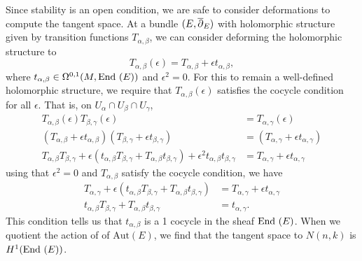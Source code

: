 	
	Since stability is an open condition, we are safe to consider deformations to compute the tangent space. At a bundle $(E,\overline{\partial}_E)$ with holomorphic structure given by transition functions $T_{\alpha,\beta}$, we can consider deforming the holomorphic structure to 
	\begin{equation}
	T_{\alpha,\beta}(\epsilon) = T_{\alpha,\beta} + \epsilon t_{\alpha,\beta},
	\end{equation}
	where $t_{\alpha,\beta} \in \Omega^{0,1}(M,\text{End }(E))$ and $\epsilon^2=0$. For this to remain a well-defined holomorphic structure, we require that $T_{\alpha,\beta}(\epsilon)$ satisfies the cocycle condition for all $\epsilon$. That is, on $U_{\alpha}\cap U_{\beta}\cap U_{\gamma}$,
	\begin{align*}
	T_{\alpha,\beta}(\epsilon)T_{\beta,\gamma}(\epsilon) &= T_{\alpha,\gamma}(\epsilon)\\
	\left(T_{\alpha,\beta} + \epsilon t_{\alpha,\beta} \right)
	\left(T_{\beta,\gamma} + \epsilon t_{\beta,\gamma} \right) &=
	\left(T_{\alpha,\gamma} + \epsilon t_{\alpha,\gamma} \right)\\
	T_{\alpha,\beta}T_{\beta,\gamma} + \epsilon(t_{\alpha,\beta}T_{\beta,\gamma} + T_{\alpha,\beta} t_{\beta,\gamma}) + \epsilon^2 t_{\alpha,\beta}t_{\beta,\gamma} &= T_{\alpha,\gamma} + \epsilon t_{\alpha,\gamma}
	\end{align*}
	using that $\epsilon^2 = 0$ and $T_{\alpha,\beta}$ satisfy the cocycle condition, we have
	\begin{align*}
	T_{\alpha,\gamma} + \epsilon(t_{\alpha,\beta} T_{\beta,\gamma} + T_{\alpha,\beta} t_{\beta,\gamma}) &= T_{\alpha,\gamma} + \epsilon t_{\alpha,\gamma}\\
	t_{\alpha,\beta} T_{\beta,\gamma} + T_{\alpha,\beta} t_{\beta,\gamma} &= t_{\alpha,\gamma}.
	\end{align*}
	This condition tells us that $t_{\alpha,\beta}$ is a 1 cocycle in the sheaf $\text{End }(E)$. When we quotient the action of of $\text{Aut}(E)$, we find that the tangent space to $N(n,k)$ is $H^1(\text{End }(E))$. 
	
